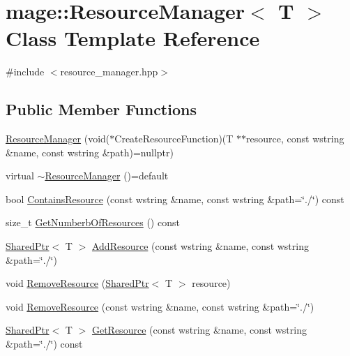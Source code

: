 \hypertarget{classmage_1_1_resource_manager}{}\section{mage\+:\+:Resource\+Manager$<$ T $>$ Class Template Reference}
\label{classmage_1_1_resource_manager}


{\ttfamily \#include $<$resource\+\_\+manager.\+hpp$>$}

\subsection*{Public Member Functions}
\begin{DoxyCompactItemize}
\item 
\hyperlink{classmage_1_1_resource_manager_ab8596e3f3c9fa2eb693cf4cc9aeb95d9}{Resource\+Manager} (void($\ast$Create\+Resource\+Function)(T $\ast$$\ast$resource, const wstring \&name, const wstring \&path)=nullptr)
\item 
virtual \hyperlink{classmage_1_1_resource_manager_a60685932f6c5f40333cd1e072a6f8c81}{$\sim$\+Resource\+Manager} ()=default
\item 
bool \hyperlink{classmage_1_1_resource_manager_a3ce8e6eef6c07dc672306271d2274ff6}{Contains\+Resource} (const wstring \&name, const wstring \&path=\char`\"{}./\char`\"{}) const
\item 
size\+\_\+t \hyperlink{classmage_1_1_resource_manager_a1872b087dac1794746b320c6ece63fd8}{Get\+Numberb\+Of\+Resources} () const
\item 
\hyperlink{namespacemage_a1e01ae66713838a7a67d30e44c67703e}{Shared\+Ptr}$<$ T $>$ \hyperlink{classmage_1_1_resource_manager_a97e20a40abfebc7709ddd51d78f991b9}{Add\+Resource} (const wstring \&name, const wstring \&path=\char`\"{}./\char`\"{})
\item 
void \hyperlink{classmage_1_1_resource_manager_ac557e5047590d0403291557c88966574}{Remove\+Resource} (\hyperlink{namespacemage_a1e01ae66713838a7a67d30e44c67703e}{Shared\+Ptr}$<$ T $>$ resource)
\item 
void \hyperlink{classmage_1_1_resource_manager_a1d9f7a5dfbf75c3c8d09c2130bee11f1}{Remove\+Resource} (const wstring \&name, const wstring \&path=\char`\"{}./\char`\"{})
\item 
\hyperlink{namespacemage_a1e01ae66713838a7a67d30e44c67703e}{Shared\+Ptr}$<$ T $>$ \hyperlink{classmage_1_1_resource_manager_a7632144a5d65ba34b9d1923b9201f129}{Get\+Resource} (const wstring \&name, const wstring \&path=\char`\"{}./\char`\"{}) const
\end{DoxyCompactItemize}
